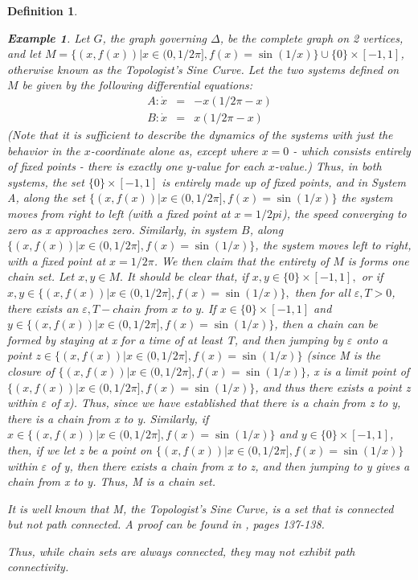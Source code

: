 \documentclass[11pt]{article}
\newtheorem{defn}[thm]{Definition}
\newtheorem{ex}[thm]{Example}
\begin{document}
\begin{defn}
\begin{ex}
Let $G$, the graph governing $\Delta$, be the complete graph on 2 vertices, and let $M=\{(x,f(x))| x\in(0,1/2\pi], f(x)=\sin(1/x)\}\cup\{0\}\times[-1,1]$, otherwise known as the Topologist's Sine Curve.   Let the two systems defined on $M$ be given by the following differential equations:
\begin{eqnarray}
A: \dot{x}&=&-x(1/2\pi-x)\\
B: \dot{x}&=&x(1/2\pi-x)
\end{eqnarray}
(Note that it is sufficient to describe the dynamics of the systems with just the behavior in the $x$-coordinate alone as, except where $x=0$ - which consists entirely of fixed points - there is exactly one $y$-value for each $x$-value.) Thus, in both systems, the set $\{0\}\times[-1,1]$ is entirely made up of fixed points, and in System A, along the set $\{(x,f(x))| x\in(0,1/2\pi], f(x)=\sin(1/x)\}$ the system moves from right to left (with a fixed point at $x=1/2pi$), the speed converging to zero as x approaches zero.  Similarly, in system $B$, along $\{(x,f(x))| x\in(0,1/2\pi], f(x)=\sin(1/x)\}$, the system moves left to right, with a fixed point at $x=1/2\pi$.  We then claim that the entirety of $M$ is forms one chain set.  
Let $x,y \in M.$ It should be clear that, if $x,y \in \{0\} \times [-1,1],$ or if $x,y \in \{(x,f(x))|x \in (0,1/2\pi],f(x)= \sin(1/x)\},$ then for all $\varepsilon,T > 0 $, there exists an $\varepsilon,T-chain$ from $x$ to $y.$ If $x \in \{0\}\times [-1,1]$ and $y \in \{(x,f(x))|x \in (0,1/2\pi],f(x) = \sin(1/x)\}$, then a chain can be formed by staying at x for a time of at least T, and then jumping by $\varepsilon$ onto a point $z \in \{(x,f(x))|x \in(0, 1/2\pi], f (x) = \sin(1/x)\}$ (since M is the closure of $\{(x, f (x))|x \in (0, 1/2\pi], f (x) = \sin(1/x)\}$, x is a limit point of  $\{(x,f(x))|x \in(0,1/2\pi],f(x) = \sin(1/x)\}$, and thus there exists a point z within $\varepsilon$ of x). Thus, since we have established that there is a chain from z to y, there is a chain from x to y. Similarly, if $x\in \{(x, f (x))|x \in (0, 1/2\pi], f (x) = \sin(1/x)\}$ and $y \in \{0\} \times [-1, 1]$, then, if we let z be a point on $\{(x, f (x))|x \in (0, 1/2\pi], f (x) = \sin(1/x)\}$ within $\varepsilon$ of y, then there exists a chain from x to z, and then jumping to y gives a chain from x to y. Thus, M is a chain set.

It is well known that M, the Topologist's Sine Curve, is a set that is connected but not path connected. A proof can be found in \cite{counterexamples}, pages 137-138.
\end{ex}
\noindent Thus, while chain sets are always connected, they may not exhibit path connectivity.  \\


\end{defn}
\end{document}
